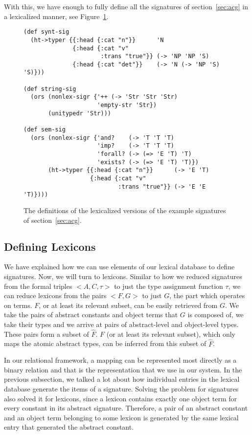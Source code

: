 With this, we have enough to fully define all the signatures of
section~\ref{sec:acg} in a lexicalized manner, see
Figure~\ref{fig:example-sig-impl}.

\begin{figure}
  \centering
\begin{verbatim}
(def synt-sig
  (ht->typer {{:head {:cat "n"}}      'N
              {:head {:cat "v"
                      :trans "true"}} (-> 'NP 'NP 'S)
              {:head {:cat "det"}}    (-> 'N (-> 'NP 'S) 'S)}))

(def string-sig
  (ors (nonlex-sigr {'++ (-> 'Str 'Str 'Str)
                     'empty-str 'Str})
       (unitypedr 'Str)))

(def sem-sig
  (ors (nonlex-sigr {'and?    (-> 'T 'T 'T)
                     'imp?    (-> 'T 'T 'T)
                     'forall? (-> (=> 'E 'T) 'T)
                     'exists? (-> (=> 'E 'T) 'T)})
       (ht->typer {{:head {:cat "n"}}      (-> 'E 'T)
                   {:head {:cat "v"
                           :trans "true"}} (-> 'E 'E 'T)})))
\end{verbatim}
  \caption{\label{fig:example-sig-impl} The definitions of the
    lexicalized versions of the example signatures of
    section~\ref{sec:acg}.}
\end{figure}


\subsection{Defining Lexicons}
\label{ssec:def-lex}

We have explained how we can use elements of our lexical database to
define signatures. Now, we will turn to lexicons. Similar to how we
reduced signatures from the formal triples $\mathopen{<}A, C,
\tau\mathclose{>}$ to just the type assignment function $\tau$, we can
reduce lexicons from the pairs $\mathopen{<}F, G\mathclose{>}$ to just
$G$, the part which operates on terms. $F$, or at least its relevant
subset, can be easily retrieved from $G$. We take the pairs of abstract
constants and object terms that $G$ is composed of, we take their types
and we arrive at pairs of abstract-level and object-level types. These
pairs form a subset of $\hat{F}$. $F$ (or at least its relevant subset),
which only maps the atomic abstract types, can be inferred from this
subset of $\hat{F}$.

In our relational framework, a mapping can be represented most directly
as a binary relation and that is the representation that we use in our
system. In the previous subsection, we talked a lot about how individual
entries in the lexical database generate the items of a
signature. Solving the problem for signatures also solved it for
lexicons, since a lexicon contains exactly one object term for every
constant in its abstract signature. Therefore, a pair of an abstract
constant and an object term belonging to some lexicon is generated by
the same lexical entry that generated the abstract constant.

